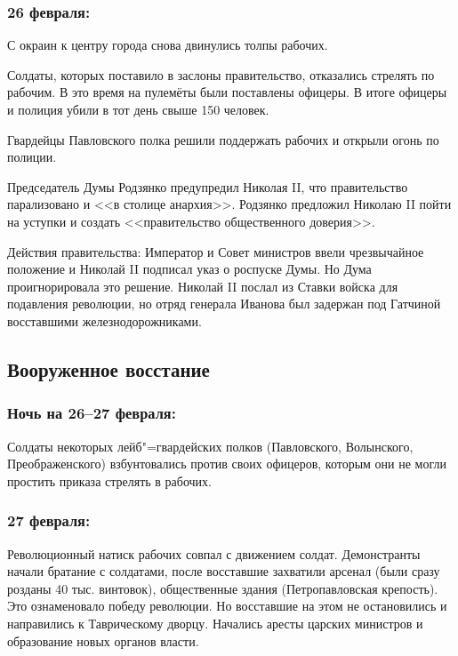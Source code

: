 \subsubsection{\textbf{26 февраля:}}

С окраин к центру города снова двинулись толпы рабочих.

Солдаты, которых поставило в заслоны правительство, отказались стрелять по рабочим. В это время на пулемёты были поставлены офицеры. В итоге офицеры и полиция убили в тот день свыше 150 человек.

Гвардейцы Павловского полка решили поддержать рабочих и открыли огонь по полиции.

Председатель Думы Родзянко предупредил Николая II, что правительство парализовано и <<в столице анархия>>. Родзянко предложил Николаю II пойти на уступки и создать <<правительство общественного доверия>>.

Действия правительства: Император и Совет министров ввели чрезвычайное положение и Николай II подписал указ о роспуске Думы. Но Дума проигнорировала это решение. Николай II послал из Ставки войска для подавления революции, но отряд генерала Иванова был задержан под Гатчиной восставшими железнодорожниками.

\subsection{Вооруженное восстание}

\subsubsection{\textbf{Ночь на 26--27 февраля:}}

Солдаты некоторых лейб"=гвардейских полков (Павловского, Волынского, Преображенского) взбунтовались против своих офицеров, которым они не могли простить приказа стрелять в рабочих.

\subsubsection{\textbf{27 февраля:}}

Революционный натиск рабочих совпал с движением солдат. Демонстранты начали братание с солдатами, после восставшие захватили арсенал (были сразу розданы 40 тыс. винтовок), общественные здания (Петропавловская крепость). Это ознаменовало победу революции. Но восставшие на этом не остановились и направились к Таврическому дворцу. Начались аресты царских министров и образование новых органов власти.


